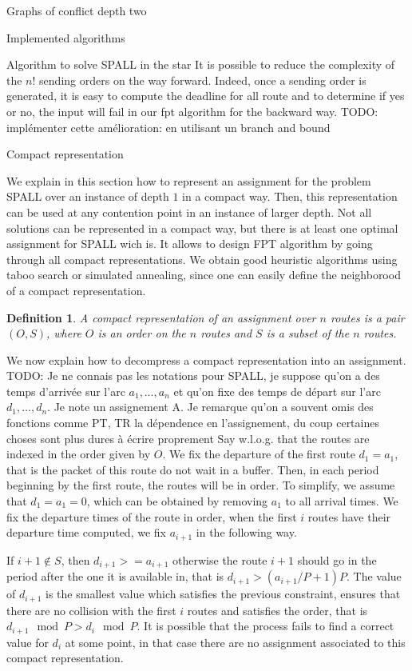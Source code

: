 \documentclass[10pt]{article}
\newtheorem{definition}{Definition}
\newcommand{\todo}[1]{{\color{red} TODO: {#1}}}
\newcommand\spall{\textsc{SPALL}\xspace}
\begin{document}
\begin{section}{Graphs of conflict depth two}
\begin{subsection}{Implemented algorithms}
\begin{subsubsection}{Algorithm to solve \spall in the star}
It is possible to reduce the complexity of the $n!$ sending orders on the way forward. Indeed, once a sending order is generated, it is easy to compute the deadline for all route and to determine if yes or no, the input will fail in our fpt algorithm for the backward way.
\todo{implémenter cette amélioration: en utilisant un branch and bound}


  \end{subsubsection}
\end{subsection}

\begin{subsection}{Compact representation}

We explain in this section how to represent an assignment for the problem 
\spall over an instance of depth $1$ in a compact way. Then, this representation
can be used at any contention point in an instance of larger depth.
Not all solutions can be represented in a compact way, but there
is at least one optimal assignment for \spall wich is.
It allows to design FPT algorithm by going through all compact 
representations. We obtain good heuristic algorithms using taboo search or simulated annealing, since one can easily define the neighborood of a compact representation.

\begin{definition}
A compact representation of an assignment over $n$ routes is a pair $(O,S)$,
where $O$ is an order on the $n$ routes and $S$ is a subset of the $n$ routes.
\end{definition}

We now explain how to decompress a compact representation into an assignment.
\todo{Je ne connais pas les notations pour \spall, je suppose qu'on a des temps
d'arrivée sur l'arc $a_1,\dots,a_n$ et qu'on fixe des temps de départ sur l'arc 
$d_1,\dots,d_n$. Je note un assignement A. Je remarque qu'on a souvent omis des 
fonctions comme PT, TR la dépendence en l'assignement, du coup certaines choses sont 
plus dures à écrire proprement}
Say w.l.o.g. that the routes are indexed in the order given by $O$.
We fix the departure of the first route $d_1 = a_1$, that is the packet of this route do not wait in a buffer. Then, in each period beginning by the first route, the routes will be in order. To simplify, we assume that $d_1 = a_1 = 0$, which can be obtained by removing $a_1$
to all arrival times. We fix the departure times of the route in order, when the first $i$ routes have their departure time computed, we fix $a_{i+1}$ in the following way. 

If $i+1 \notin S$, then $d_{i+1} >= a_{i+1}$ otherwise the route $i+1$ should go in the period after the one it is available in, that is $d_{i+1} > (a_{i+1}/P + 1)P$.
The value of  $d_{i+1}$ is the smallest value which satisfies the previous constraint,
ensures that there are no collision with the first $i$ routes and  satisfies the order, that is $d_{i+1} \mod P > d_i \mod P$. 
It is possible that the process fails to find a correct value for $d_i$ at some point,
in that case there are no assignment associated to this compact representation.


\end{subsection}
\end{section}
\end{document}
